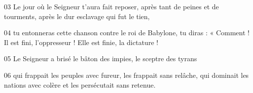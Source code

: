 
03 Le jour où le Seigneur t’aura fait reposer, après tant de peines et de tourments, après le dur esclavage qui fut le tien,

04 tu entonneras cette chanson contre le roi de Babylone, tu diras : « Comment ! Il est fini, l’oppresseur ! Elle est finie, la dictature !

05 Le Seigneur a brisé le bâton des impies, le sceptre des tyrans

06 qui frappait les peuples avec fureur, les frappait sans relâche, qui dominait les nations avec colère et les persécutait sans retenue.
